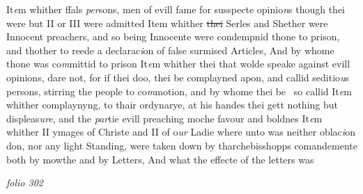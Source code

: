 \documentclass[12pt, a4paper]{book}
\begin{document}
			 It\textit{e}m whither ffals \textit{per}sons, men of evill fame for susspecte opinio\textit{n}s though thei were but II or III were admitted 
				\marginpar[\vspace{0.5cm}{\textcolor{Gray}{9}}]{}
			 Item whither \sout{thei }
               Serles and Shether
			 were Innocent preachers, and so being Innocente were condempnid thone to prison, and thother to reede a declarac\textit{i}on of false surmised Articles, And by whome thone  was co\textit{m}mittid to prison 
				\marginpar[\vspace{0.5cm}{\textcolor{Gray}{10}}]{}
			 It\textit{e}m whither thei that wolde speake against evill opinions, dare  not, for if thei doo, thei be complayned apon, and callid seditio\textit{u}s persons, stirring the people to co\textit{m}motion, and by whome thei be  so callid 
				\marginpar[\vspace{0.5cm}{\textcolor{Gray}{11}}]{}
			 It\textit{e}m whither complaynyng, to thair ordynarye, at his handes thei gett nothing but displeas\textit{ure}, and the \textit{par}tie evill preaching moche favour and boldnes 
				\marginpar[\vspace{0.5cm}{\textcolor{Gray}{12}}]{}
			 It\textit{e}m whither II ymages of Christe and II of o\textit{ur} Ladie where unto was neither oblac\textit{i}on don, nor any light Standing, were taken down by tharchebisshopps comandemente both by mowthe and by Letters, And what the effecte of the letters was

\dotfill
					

\textit{folio 302}
\end{document}
